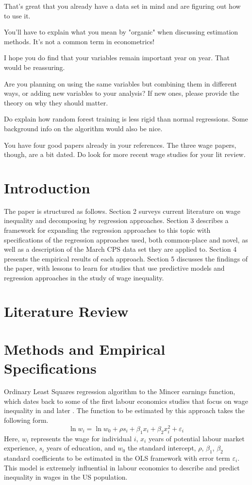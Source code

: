 \documentclass[notitlepage,12pt]{article}
\begin{document}
That's great that you already have a data set in mind and are figuring out how to use it.  

You'll have to explain what you mean by "organic" when discussing estimation methods.  It's not a common term in econometrics!

I hope you do find that your variables remain important year on year. That would be reassuring.  

Are you planning on using the same variables but combining them in different ways, or adding new variables to your analysis?  If new ones, please provide the theory on why they should matter.  

Do explain how random forest training is less rigid than normal regressions.  Some background info on the algorithm would also be nice.  

You have four good papers already in your references.  The three wage papers, though, are a bit dated.  Do look for more recent wage studies for your lit review.  

\section{Introduction}
The paper is structured as follows.  Section 2 surveys current literature on wage inequality and decomposing by regression approaches.  Section 3 describes a framework for expanding the regression approaches to this topic with specifications of the regression approaches used, both common-place and novel, as well as a description of the March CPS data set they are applied to.  Section 4 presents the empirical results of each approach.  Section 5 discusses the findings of the paper, with lessons to learn for studies that use predictive models and regression approaches in the study of wage inequality.

\section{Literature Review}

\section{Methods and Empirical Specifications}
Ordinary Least Squares regression algorithm to the Mincer earnings function, which dates back to some of the first labour economics studies that focus on wage inequality in \cite{mincer1958investment} and later \cite{mincer1974schooling}.  The function to be estimated by this approach takes the following form.
\begin{equation}
\ln w_i = \ln w_0 + \rho s_i +\beta_1 x_i + \beta_2 x_i^2 + \varepsilon_i
\end{equation}
Here, $w_i$ represents the wage for individual $i$, $x_i$ years of potential labour market experience, $s_i$ years of education, and $w_0$ the standard intercept, $\rho$, $\beta_1$, $\beta_2$ standard coefficients to be estimated in the OLS framework with error term $\varepsilon_i$.  This model is extremely influential in labour economics to describe and predict inequality in wages in the US population.
\end{document}
